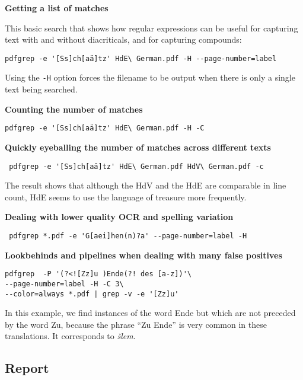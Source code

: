 \documentclass[
  letterpaper,
]{tufte-handout}
\begin{document}
\textbf{Getting a list of matches}

This basic search that shows how regular expressions can be useful for
capturing text with and without diacriticals, and for capturing
compounds:

\begin{verbatim}
pdfgrep -e '[Ss]ch[aä]tz' HdE\ German.pdf -H --page-number=label
\end{verbatim}

Using the \texttt{-H} option forces the filename to be
output when there is only a single text being searched.

\textbf{Counting the number of matches}

\begin{verbatim}
pdfgrep -e '[Ss]ch[aä]tz' HdE\ German.pdf -H -C
\end{verbatim}

\textbf{Quickly eyeballing the number of matches across different texts}

\begin{verbatim}
 pdfgrep -e '[Ss]ch[aä]tz' HdE\ German.pdf HdV\ German.pdf -c
\end{verbatim}

The result shows that although the HdV and the HdE are comparable in
line count, HdE seems to use the language of treasure more frequently.

\textbf{Dealing with lower quality OCR and spelling variation}

\begin{verbatim}
 pdfgrep *.pdf -e 'G[aei]hen(n)?a' --page-number=label -H
\end{verbatim}

\textbf{Lookbehinds and pipelines when dealing with many false
positives}

\begin{verbatim}
pdfgrep  -P '(?<![Zz]u )Ende(?! des [a-z])'\
--page-number=label -H -C 3\
--color=always *.pdf | grep -v -e '[Zz]u'
\end{verbatim}

In this example, we find instances of the word Ende but which are not
preceded by the word Zu, because the phrase ``Zu Ende'' is very common
in these translations. It corresponds to \emph{šlem}.

\subsection{Report}\label{report}
\end{document}
